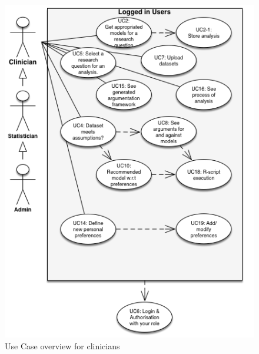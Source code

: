\begin{figure}[!ht]
\centering
\includegraphics[width=\textwidth]{figures/use_case_clinician}
\caption{Use Case overview for clinicians}
\label{fig:usecase:clinician}
\end{figure}

